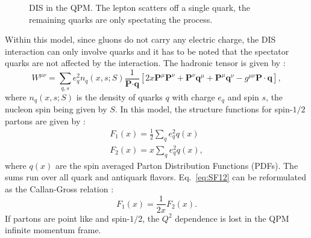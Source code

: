 \begin{figure}[!h]
  \centering

	\caption{DIS in the QPM. The lepton scatters off a single quark, the remaining quarks are only spectating the process.}
	\label{pic:DISQPM}
\end{figure}

Within this model, since gluons do not carry any electric charge, the DIS interaction can only involve quarks and it has to be noted that the spectator quarks are not affected by the interaction. The hadronic tensor is given by \cite{AEL} :
%
\begin{equation}
  W^{\mu\nu} = \sum\limits_{q,s}e^2_qn_q(x,s;S)\frac{1}{\textbf{P}\cdot\textbf{q}}\left[2x\textbf{P}^{\mu}\textbf{P}^{\nu}
  +\textbf{P}^{\nu}\textbf{q}^{\mu}+\textbf{P}^{\mu}\textbf{q}^{\nu}-g^{\mu\nu}\textbf{P}\cdot\textbf{q}\right],
  \label{eq:HadronicTensor}
\end{equation}
%
where $n_q(x,s;S)$ is the density of quarks $q$ with charge $e_q$ and spin $s$, the nucleon spin being given by $S$. In this model, the structure functions for spin-$1/2$ partons are given by \cite{AEL} :
%
\begin{equation}\label{eq:SF12}
  \begin{split}
  F_1(x)=\frac{1}{2}\sum\limits_{q}e^2_qq(x) \\
  F_2(x)=x\sum\limits_{q}e^2_qq(x),
  \end{split}
\end{equation}
%
where $q(x)$ are the spin averaged Parton Distribution Functions (PDFs). The sums run over all quark and antiquark flavors. Eq.~\ref{eq:SF12} can be reformulated as the Callan-Gross relation \cite{CallanGross} :
%
\begin{equation*}
  F_1(x)=\frac{1}{2x}F_2(x).
\end{equation*}
%
If partons are point like and spin-$1/2$, the $Q^2$ dependence is lost in the QPM infinite momentum frame.

